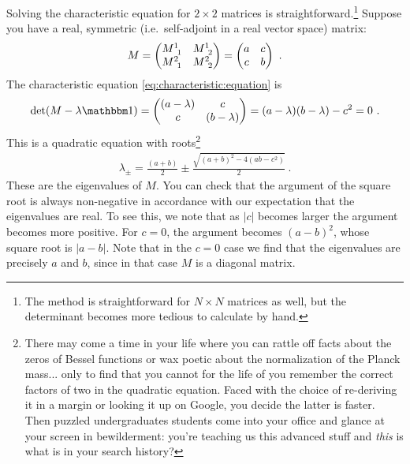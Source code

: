 \documentclass[12pt, oneside]{report}    %
\begin{document}
\begin{example}
Solving the characteristic equation for $2\times 2$ matrices is straightforward.\footnote{The method is straightforward for $N\times N$ matrices as well, but the determinant becomes more tedious to calculate by hand.} Suppose you have a real, symmetric (i.e.\ self-adjoint in a real vector space) matrix:
\begin{align}
    M = 
    \begin{pmatrix}
        M\aij 11 & M\aij 12 \\
        M\aij 21 & M\aij 22
    \end{pmatrix}
    =
    \begin{pmatrix}
        a & c \\
        c & b
    \end{pmatrix} \ .
\end{align}
The characteristic equation \eqref{eq:characteristic:equation} is
\begin{align}
    \det(M - \lambda \one) 
    =
    \begin{pmatrix}
        (a-\lambda) & c \\
        c & (b-\lambda)
    \end{pmatrix}
    = 
    (a-\lambda)(b-\lambda)-c^2 = 0 \ .
\end{align}
This is a quadratic equation with roots\footnote{There may come a time in your life where you can rattle off facts about the zeros of Bessel functions or wax poetic about the normalization of the Planck mass... only to find that you cannot for the life of you remember the correct factors of two in the quadratic equation. Faced with the choice of re-deriving it in a margin or looking it up on Google, you decide the latter is faster. Then puzzled undergraduates students come into your office and glance at your screen in bewilderment: you're teaching us this advanced stuff and \emph{this} is what is in your search history?}
\begin{align}
    \lambda_\pm = \frac{(a+b)}{2}\pm \frac{\sqrt{(a+b)^2 - 4(ab-c^2)}}{2} \ .
\end{align}
These are the eigenvalues of $M$. You can check that the argument of the square root is always non-negative in accordance with our expectation that the eigenvalues are real. To see this, we note that as $|c|$ becomes larger the argument becomes more positive. For $c=0$, the argument becomes $(a-b)^2$, whose square root is $|a-b|$. Note that in the $c=0$ case we find that the eigenvalues are precisely $a$ and $b$, since in that case $M$ is a diagonal matrix.
\end{example}
\end{document}
